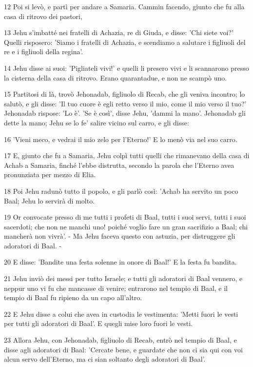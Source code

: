 \par 12 Poi si levò, e partì per andare a Samaria. Cammin facendo, giunto che fu alla casa di ritrovo dei pastori,
\par 13 Jehu s'imbatté nei fratelli di Achazia, re di Giuda, e disse: 'Chi siete voi?' Quelli risposero: 'Siamo i fratelli di Achazia, e scendiamo a salutare i figliuoli del re e i figliuoli della regina'.
\par 14 Jehu disse ai suoi: 'Pigliateli vivi!' e quelli li presero vivi e li scannarono presso la cisterna della casa di ritrovo. Erano quarantadue, e non ne scampò uno.
\par 15 Partitosi di là, trovò Jehonadab, figliuolo di Recab, che gli veniva incontro; lo salutò, e gli disse: 'Il tuo cuore è egli retto verso il mio, come il mio verso il tuo?' Jehonadab rispose: 'Lo è'. 'Se è così', disse Jehu, 'dammi la mano'. Jehonadab gli dette la mano; Jehu se lo fe' salire vicino sul carro, e gli disse:
\par 16 'Vieni meco, e vedrai il mio zelo per l'Eterno!' E lo menò via nel suo carro.
\par 17 E, giunto che fu a Samaria, Jehu colpì tutti quelli che rimanevano della casa di Achab a Samaria, finché l'ebbe distrutta, secondo la parola che l'Eterno avea pronunziata per mezzo di Elia.
\par 18 Poi Jehu radunò tutto il popolo, e gli parlò così: 'Achab ha servito un poco Baal; Jehu lo servirà di molto.
\par 19 Or convocate presso di me tutti i profeti di Baal, tutti i suoi servi, tutti i suoi sacerdoti; che non ne manchi uno! poiché voglio fare un gran sacrifizio a Baal; chi mancherà non vivrà'. - Ma Jehu faceva questo con astuzia, per distruggere gli adoratori di Baal. -
\par 20 E disse: 'Bandite una festa solenne in onore di Baal!' E la festa fu bandita.
\par 21 Jehu inviò dei messi per tutto Israele; e tutti gli adoratori di Baal vennero, e neppur uno vi fu che mancasse di venire; entrarono nel tempio di Baal, e il tempio di Baal fu ripieno da un capo all'altro.
\par 22 E Jehu disse a colui che avea in custodia le vestimenta: 'Metti fuori le vesti per tutti gli adoratori di Baal'. E quegli mise loro fuori le vesti.
\par 23 Allora Jehu, con Jehonadab, figliuolo di Recab, entrò nel tempio di Baal, e disse agli adoratori di Baal: 'Cercate bene, e guardate che non ci sia qui con voi alcun servo dell'Eterno, ma ci sian soltanto degli adoratori di Baal'.

